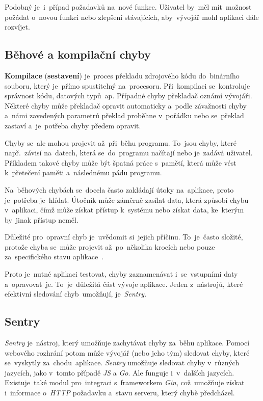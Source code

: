 \documentclass[11pt,a4paper]{report}
\let\oldacrshort\acrshort
\renewcommand{\acrshort}[1]{\emph{\normalsize\color[rgb]{0,0,0}\noindent\oldacrshort{#1}}}
\begin{document}
                Podobný je~i~případ požadavků na~nové funkce. Uživatel by~měl mít~možnost požádat o~novou funkci nebo zlepšení stávajících,
                aby~vývojář mohl aplikaci dále rozvíjet.

            \subsection{Běhové a kompilační chyby}
                \textbf{Kompilace} (\textbf{sestavení}) je~proces překladu zdrojového kódu do~binárního souboru, který je~přímo spustitelný na~procesoru. Při~kompilaci se~kontroluje správnost kódu, datových typů~ap. Případné chyby překladač oznámí vývojáři. Některé chyby může překladač opravit automaticky a~podle závažnosti chyby a~námi zavedených parametrů překlad proběhne v~pořádku nebo se~překlad zastaví a~je~potřeba chyby předem opravit.

                Chyby se~ale mohou projevit až~při~běhu programu. To~jsou chyby, které např.~závisí na~datech, která se~do~programu načítají nebo je~zadává uživatel. Příkladem takové chyby může být špatná práce s~pamětí, která může vést k~přetečení paměti a~následnému pádu programu.

                Na~běhových chybách se~docela často zakládají útoky na~aplikace, proto je~potřeba je~hlídat. Útočník může záměrně zasílat data, která způsobí chybu v~aplikaci, čímž může získat přístup k~systému nebo získat data, ke~kterým by~jinak přístup neměl.

                Důležité pro~opravní chyb je~uvědomit si~jejich příčinu. To~je~často složité, protože chyba se~může projevit až~po~několika krocích nebo pouze za~specifického stavu aplikace~\cite{graham2021ethical}.

                Proto je~nutné aplikaci testovat, chyby zaznamenávat i~se~vstupními daty a~opravovat~je. To~je~důležitá část vývoje aplikace. Jeden z~nástrojů, které efektivní sledování chyb~umožňují, je~\emph{Sentry}.

            \subsection{Sentry}
                \emph{Sentry} je~nástroj, který umožňuje zachytávat chyby za~běhu aplikace. Pomocí webového rozhrání potom může vývojář (nebo jeho tým) sledovat chyby, které se~vyskytly za~chodu~aplikace. \emph{Sentry} umožňuje sledovat chyby v~různých jazycích, jako v~tomto případě \acrshort{JS} a \emph{Go}. Ale funguje i~v~dalších jazycích. Existuje~také modul pro~integraci s~frameworkem \emph{Gin}, což~umožňuje získat i~informace o~\acrshort{HTTP} požadavku a~stavu serveru, který chybě předcházel.
                
\end{document}
